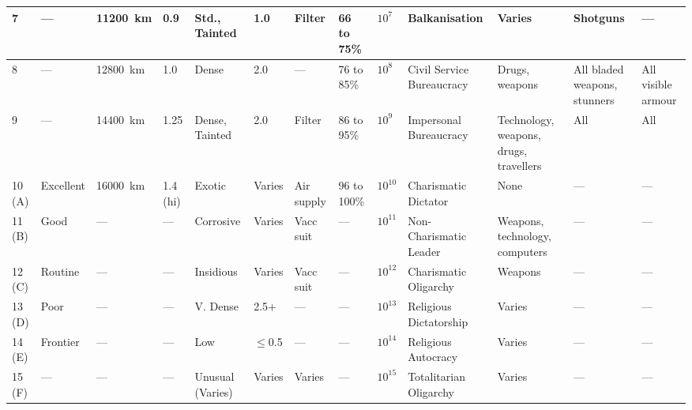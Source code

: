 \documentclass[landscape]{cheatsheet}
\begin{document}
\begin{tabularx}{\linewidth}{l|l|l|l|l|l|l|l|l|l|X|X|l}
  7      & ---       & \SI{11200}{\kilo\meter}      & 0.9       & Std., Tainted    & 1.0       & Filter             & 66 to 75\%  &  $10^{7}$ & Balkanisation & Varies & Shotguns & --- \\ \midrule
  8      & ---       & \SI{12800}{\kilo\meter}      & 1.0       & Dense            & 2.0       & ---                & 76 to 85\%  &  $10^{8}$ & Civil Service Bureaucracy & Drugs, weapons & All bladed weapons, stunners & All visible armour \\
  9      & ---       & \SI{14400}{\kilo\meter}      & 1.25      & Dense, Tainted   & 2.0       & Filter             & 86 to 95\%  &  $10^{9}$ & Impersonal Bureaucracy & Technology, weapons, drugs, travellers & All & All \\
  10 (A) & Excellent & \SI{16000}{\kilo\meter}      & 1.4 (hi)  & Exotic           & Varies    & Air supply         & 96 to 100\% & $10^{10}$ & Charismatic Dictator & None & --- & --- \\
  11 (B) & Good      & ---                          & ---       & Corrosive        & Varies    & Vacc suit          & ---         & $10^{11}$ & Non-Charismatic Leader & Weapons, technology, computers & --- & ---  \\ \midrule
  12 (C) & Routine   & ---                          & ---       & Insidious        & Varies    & Vacc suit          & ---         & $10^{12}$ & Charismatic Oligarchy & Weapons & --- & --- \\
  13 (D) & Poor      & ---                          & ---       & V. Dense         & 2.5+      & ---                & ---         & $10^{13}$ & Religious Dictatorship & Varies & --- & --- \\
  14 (E) & Frontier  & ---                          & ---       & Low              & $\leq$0.5 & ---                & ---         & $10^{14}$ & Religious Autocracy & Varies & --- & --- \\
  15 (F) & ---       & ---                          & ---       & Unusual (Varies) & Varies    & Varies             & ---         & $10^{15}$ & Totalitarian Oligarchy & Varies & --- & --- \\ \bottomrule
\end{tabularx}
\end{document}
